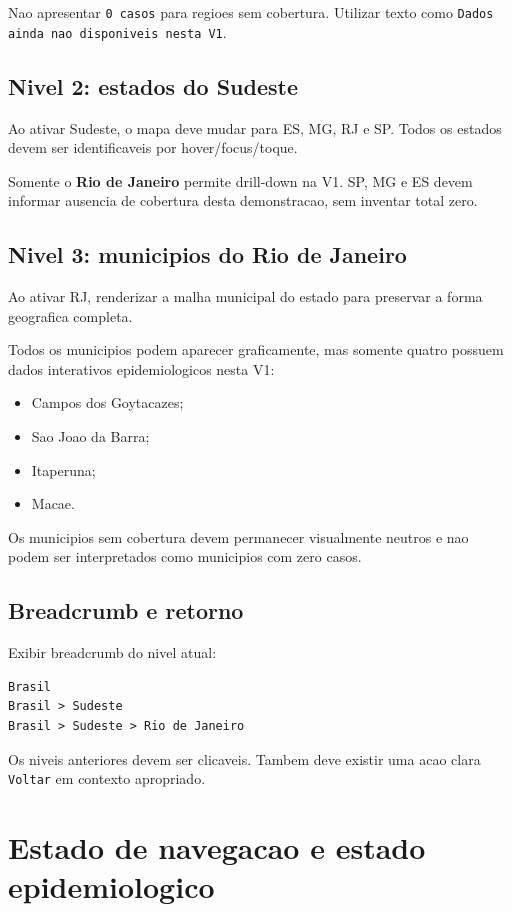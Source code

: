 \documentclass[12pt,a4paper]{article}
\begin{document}
Nao apresentar \texttt{0 casos} para regioes sem cobertura. Utilizar texto como \texttt{Dados ainda nao disponiveis nesta V1}.

\subsection{Nivel 2: estados do Sudeste}

Ao ativar Sudeste, o mapa deve mudar para ES, MG, RJ e SP. Todos os estados devem ser identificaveis por hover/focus/toque.

Somente o \textbf{Rio de Janeiro} permite drill-down na V1. SP, MG e ES devem informar ausencia de cobertura desta demonstracao, sem inventar total zero.

\subsection{Nivel 3: municipios do Rio de Janeiro}

Ao ativar RJ, renderizar a malha municipal do estado para preservar a forma geografica completa.

Todos os municipios podem aparecer graficamente, mas somente quatro possuem dados interativos epidemiologicos nesta V1:

\begin{itemize}[leftmargin=*]
    \item Campos dos Goytacazes;
    \item Sao Joao da Barra;
    \item Itaperuna;
    \item Macae.
\end{itemize}

Os municipios sem cobertura devem permanecer visualmente neutros e nao podem ser interpretados como municipios com zero casos.

\subsection{Breadcrumb e retorno}

Exibir breadcrumb do nivel atual:

\begin{lstlisting}
Brasil
Brasil > Sudeste
Brasil > Sudeste > Rio de Janeiro
\end{lstlisting}

Os niveis anteriores devem ser clicaveis. Tambem deve existir uma acao clara \texttt{Voltar} em contexto apropriado.

\section{Estado de navegacao e estado epidemiologico}
\end{document}
